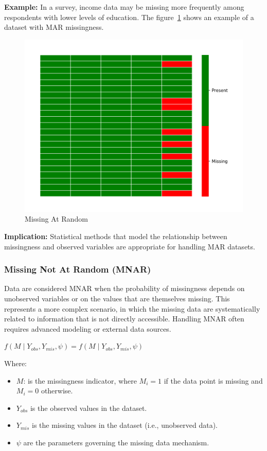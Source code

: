 \documentclass[a4paper,12pt]{article}
\begin{document}
\textbf{Example:} In a survey, income data may be missing more frequently among respondents with lower levels of education. The figure~\ref{fig:mar_heatmap} shows an example of a dataset with MAR missingness.

\begin{figure}[H]
\centering
\includegraphics[width=0.5\linewidth]{MAR_heatmap.png}
\caption{Missing At Random}
\label{fig:mar_heatmap}
\end{figure}

\textbf{Implication:} Statistical methods that model the relationship between missingness and observed variables are appropriate for handling MAR datasets.

\subsubsection{Missing Not At Random (MNAR)}

Data are considered MNAR when the probability of missingness depends on unobserved variables or on the values that are themselves missing. This represents a more complex scenario, in which the missing data are systematically related to information that is not directly accessible. Handling MNAR often requires advanced modeling or external data sources. ~\cite{24}

\begin{center}
$f(M \mid Y_{obs}, Y_{mis}, \psi) = f(M \mid Y_{obs}, Y_{mis}, \psi)$
\end{center}

Where:
\begin{itemize}
    \item \( M \): is the missingness indicator, where \( M_i = 1 \) if the data point is missing and \( M_i = 0 \) otherwise.
    \item \( Y_{obs} \) is the observed values in the dataset.
    \item \( Y_{mis} \) is the missing values in the dataset (i.e., unobserved data).
    \item \( \psi \) are the parameters governing the missing data mechanism.
\end{itemize}
\end{document}
